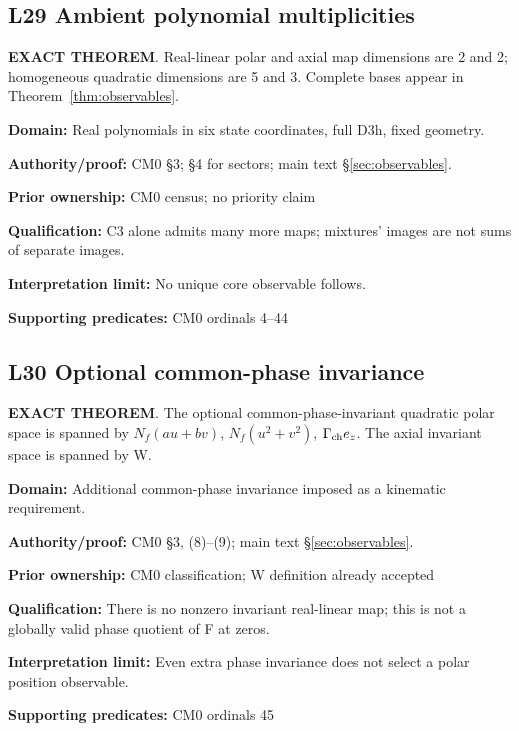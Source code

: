 \par\noindent\begin{minipage}{\linewidth}
\subsection*{L29 Ambient polynomial multiplicities}
\textbf{EXACT THEOREM}. Real-linear polar and axial map dimensions are 2 and 2; homogeneous quadratic dimensions are 5 and 3. Complete bases appear in Theorem~\ref{thm:observables}.\par
\textbf{Domain:} Real polynomials in six state coordinates, full D3h, fixed geometry.\par
\textbf{Authority/proof:} CM0 \S{}3; \S{}4 for sectors; main text \S\ref{sec:observables}.\par
\textbf{Prior ownership:} CM0 census; no priority claim\par
\textbf{Qualification:} C3 alone admits many more maps; mixtures' images are not sums of separate images.\par
\textbf{Interpretation limit:} No unique core observable follows.\par
\textbf{Supporting predicates:} CM0 ordinals 4--44\par
\end{minipage}\par\medskip
\par\noindent\begin{minipage}{\linewidth}
\subsection*{L30 Optional common-phase invariance}
\textbf{EXACT THEOREM}. The optional common-phase-invariant quadratic polar space is spanned by \(N_f(au+bv)\), \(N_f(u^2+v^2)\), \(\Gamma_{\rm ch}e_z\). The axial invariant space is spanned by W.\par
\textbf{Domain:} Additional common-phase invariance imposed as a kinematic requirement.\par
\textbf{Authority/proof:} CM0 \S{}3, (8)--(9); main text \S\ref{sec:observables}.\par
\textbf{Prior ownership:} CM0 classification; W definition already accepted\par
\textbf{Qualification:} There is no nonzero invariant real-linear map; this is not a globally valid phase quotient of F at zeros.\par
\textbf{Interpretation limit:} Even extra phase invariance does not select a polar position observable.\par
\textbf{Supporting predicates:} CM0 ordinals 45\par
\end{minipage}\par\medskip
